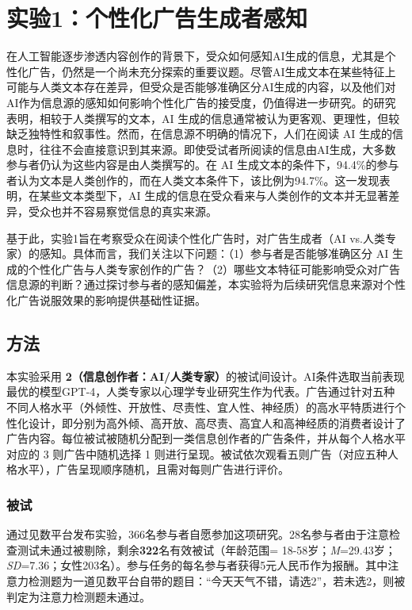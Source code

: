 \section{实验1：个性化广告生成者感知}
在人工智能逐步渗透内容创作的背景下，受众如何感知AI生成的信息，尤其是个性化广告，仍然是一个尚未充分探索的重要议题。尽管AI生成文本在某些特征上可能与人类文本存在差异，但受众是否能够准确区分AI生成的内容，以及他们对AI作为信息源的感知如何影响个性化广告的接受度，仍值得进一步研究。\citet{bai2023artificial}的研究表明，相较于人类撰写的文本，AI 生成的信息通常被认为更客观、更理性，但较缺乏独特性和叙事性。然而，在信息源不明确的情况下，人们在阅读 AI 生成的信息时，往往不会直接意识到其来源。即使受试者所阅读的信息由AI生成，大多数参与者仍认为这些内容是由人类撰写的。在 AI 生成文本的条件下，94.4\%的参与者认为文本是人类创作的，而在人类文本条件下，该比例为94.7\%。这一发现表明，在某些文本类型下，AI 生成的信息在受众看来与人类创作的文本并无显著差异，受众也并不容易察觉信息的真实来源。

基于此，实验1旨在考察受众在阅读个性化广告时，对广告生成者（AI vs.人类专家）的感知。具体而言，我们关注以下问题：（1）参与者是否能够准确区分 AI 生成的个性化广告与人类专家创作的广告？（2）哪些文本特征可能影响受众对广告信息源的判断？通过探讨参与者的感知偏差，本实验将为后续研究信息来源对个性化广告说服效果的影响提供基础性证据。

\subsection{方法}

本实验采用 \textbf{2（信息创作者：AI/人类专家）}的被试间设计。AI条件选取当前表现最优的模型GPT-4，人类专家以心理学专业研究生作为代表。广告通过针对五种不同人格水平（外倾性、开放性、尽责性、宜人性、神经质）的高水平特质进行个性化设计，即分别为高外倾、高开放、高尽责、高宜人和高神经质的消费者设计了广告内容。每位被试被随机分配到一类信息创作者的广告条件，并从每个人格水平对应的 3 则广告中随机选择 1 则进行呈现。被试依次观看五则广告（对应五种人格水平），广告呈现顺序随机，且需对每则广告进行评价。

\subsubsection{被试}

通过见数平台发布实验，366名参与者自愿参加这项研究。28名参与者由于注意检查测试未通过被剔除，剩余\textbf{322}名有效被试（年龄范围= 18-58岁；\textit{M}=29.43岁；\textit{SD}=7.36；女性203名）。参与任务的每名参与者获得5元人民币作为报酬。其中注意力检测题为一道见数平台自带的题目：“今天天气不错，请选2”，若未选2，则被判定为注意力检测题未通过。

